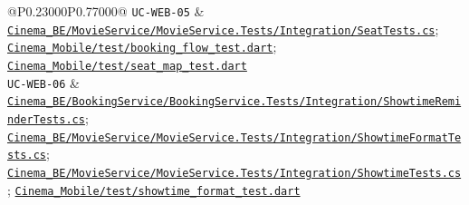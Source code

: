 \begin{longtable}{@{}P{0.23000\SRSWidth}P{0.77000\SRSWidth}@{}}
\texttt{UC-\allowbreak{}WEB-\allowbreak{}05} & \href{../../../Cinema\_BE/MovieService/MovieService.Tests/Integration/SeatTests.cs}{\texttt{Cinema\_\allowbreak{}BE/\allowbreak{}Movie\allowbreak{}Service/\allowbreak{}Movie\allowbreak{}Service.\allowbreak{}Tests/\allowbreak{}Integrat\allowbreak{}ion/\allowbreak{}Seat\allowbreak{}Tests.\allowbreak{}cs}}; \href{../../../Cinema\_Mobile/test/booking\_flow\_test.dart}{\texttt{Cinema\_\allowbreak{}Mobile/\allowbreak{}test/\allowbreak{}booking\_\allowbreak{}flow\_\allowbreak{}test.\allowbreak{}dart}}; \href{../../../Cinema\_Mobile/test/seat\_map\_test.dart}{\texttt{Cinema\_\allowbreak{}Mobile/\allowbreak{}test/\allowbreak{}seat\_\allowbreak{}map\_\allowbreak{}test.\allowbreak{}dart}} \\[3pt]
\texttt{UC-\allowbreak{}WEB-\allowbreak{}06} & \href{../../../Cinema\_BE/BookingService/BookingService.Tests/Integration/ShowtimeReminderTests.cs}{\texttt{Cinema\_\allowbreak{}BE/\allowbreak{}Booking\allowbreak{}Service/\allowbreak{}Booking\allowbreak{}Service.\allowbreak{}Tests/\allowbreak{}Integrat\allowbreak{}ion/\allowbreak{}Showtime\allowbreak{}Reminder\allowbreak{}Tests.\allowbreak{}cs}}; \href{../../../Cinema\_BE/MovieService/MovieService.Tests/Integration/ShowtimeFormatTests.cs}{\texttt{Cinema\_\allowbreak{}BE/\allowbreak{}Movie\allowbreak{}Service/\allowbreak{}Movie\allowbreak{}Service.\allowbreak{}Tests/\allowbreak{}Integrat\allowbreak{}ion/\allowbreak{}Showtime\allowbreak{}Format\allowbreak{}Tests.\allowbreak{}cs}}; \href{../../../Cinema\_BE/MovieService/MovieService.Tests/Integration/ShowtimeTests.cs}{\texttt{Cinema\_\allowbreak{}BE/\allowbreak{}Movie\allowbreak{}Service/\allowbreak{}Movie\allowbreak{}Service.\allowbreak{}Tests/\allowbreak{}Integrat\allowbreak{}ion/\allowbreak{}Showtime\allowbreak{}Tests.\allowbreak{}cs}}; \href{../../../Cinema\_Mobile/test/showtime\_format\_test.dart}{\texttt{Cinema\_\allowbreak{}Mobile/\allowbreak{}test/\allowbreak{}showtime\allowbreak{}\_\allowbreak{}format\_\allowbreak{}test.\allowbreak{}dart}} \\[3pt]

\end{longtable}
